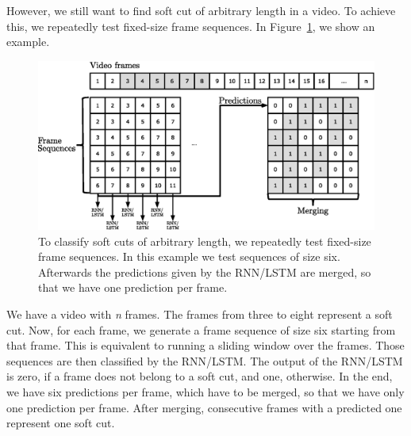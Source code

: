 However, we still want to find soft cut of arbitrary length in a video.
To achieve this, we repeatedly test fixed-size frame sequences.
In Figure~\ref{fig:soft_cut_approach}, we show an example.
\begin{figure}[!htb]
	\centering
	\includegraphics[scale=.7]{images/soft_cut_approach.eps}
	\caption{To classify soft cuts of arbitrary length, we repeatedly test fixed-size frame sequences. In this example we test sequences of size six. Afterwards the predictions given by the RNN/LSTM are merged, so that we have one prediction per frame.}
	\label{fig:soft_cut_approach}
\end{figure}
We have a video with \textit{n} frames.
The frames from three to eight represent a soft cut.
Now, for each frame, we generate a frame sequence of size six starting from that frame.
This is equivalent to running a sliding window over the frames.
Those sequences are then classified by the RNN/LSTM.
The output of the RNN/LSTM is zero, if a frame does not belong to a soft cut, and one, otherwise.
In the end, we have six predictions per frame, which have to be merged, so that we have only one prediction per frame.
After merging, consecutive frames with a predicted one represent one soft cut.

